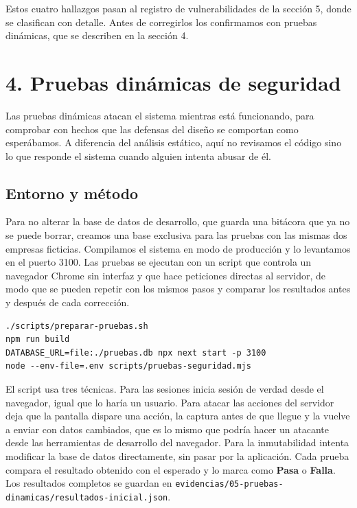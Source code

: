 \documentclass[12pt, letterpaper]{article}
\begin{document}
Estos cuatro hallazgos pasan al registro de vulnerabilidades de la sección 5, donde se clasifican con detalle. Antes de corregirlos los confirmamos con pruebas dinámicas, que se describen en la sección 4.

\section{4. Pruebas dinámicas de seguridad}

Las pruebas dinámicas atacan el sistema mientras está funcionando, para comprobar con hechos que las defensas del diseño se comportan como esperábamos. A diferencia del análisis estático, aquí no revisamos el código sino lo que responde el sistema cuando alguien intenta abusar de él.

\subsection{Entorno y método}

Para no alterar la base de datos de desarrollo, que guarda una bitácora que ya no se puede borrar, creamos una base exclusiva para las pruebas con las mismas dos empresas ficticias. Compilamos el sistema en modo de producción y lo levantamos en el puerto 3100. Las pruebas se ejecutan con un script que controla un navegador Chrome sin interfaz y que hace peticiones directas al servidor, de modo que se pueden repetir con los mismos pasos y comparar los resultados antes y después de cada corrección.

\begin{verbatim}
./scripts/preparar-pruebas.sh
npm run build
DATABASE_URL=file:./pruebas.db npx next start -p 3100
node --env-file=.env scripts/pruebas-seguridad.mjs
\end{verbatim}

El script usa tres técnicas. Para las sesiones inicia sesión de verdad desde el navegador, igual que lo haría un usuario. Para atacar las acciones del servidor deja que la pantalla dispare una acción, la captura antes de que llegue y la vuelve a enviar con datos cambiados, que es lo mismo que podría hacer un atacante desde las herramientas de desarrollo del navegador. Para la inmutabilidad intenta modificar la base de datos directamente, sin pasar por la aplicación. Cada prueba compara el resultado obtenido con el esperado y lo marca como \textbf{Pasa} o \textbf{Falla}. Los resultados completos se guardan en \nolinkurl{evidencias/05-pruebas-dinamicas/resultados-inicial.json}.
\end{document}
